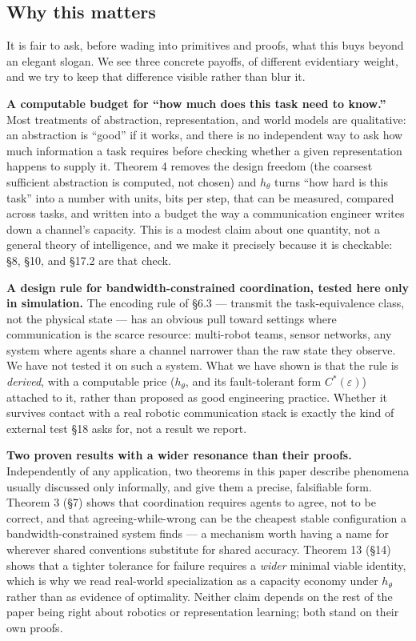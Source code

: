 \documentclass[11pt]{article}
\begin{document}
\hypertarget{why-this-matters}{%
\subsection{Why this matters}\label{why-this-matters}}

It is fair to ask, before wading into primitives and proofs, what this buys beyond an elegant slogan. We see three concrete payoffs, of different evidentiary weight, and we try to keep that difference visible rather than blur it.

\textbf{A computable budget for ``how much does this task need to know.''} Most treatments of abstraction, representation, and world models are qualitative: an abstraction is ``good'' if it works, and there is no independent way to ask how much information a task requires before checking whether a given representation happens to supply it. Theorem 4 removes the design freedom (the coarsest sufficient abstraction is computed, not chosen) and \(h_\theta\) turns ``how hard is this task'' into a number with units, bits per step, that can be measured, compared across tasks, and written into a budget the way a communication engineer writes down a channel's capacity. This is a modest claim about one quantity, not a general theory of intelligence, and we make it precisely because it is checkable: \S{}8, \S{}10, and \S{}17.2 are that check.

\textbf{A design rule for bandwidth-constrained coordination, tested here only in simulation.} The encoding rule of \S{}6.3 --- transmit the task-equivalence class, not the physical state --- has an obvious pull toward settings where communication is the scarce resource: multi-robot teams, sensor networks, any system where agents share a channel narrower than the raw state they observe. We have not tested it on such a system. What we have shown is that the rule is \emph{derived}, with a computable price (\(h_\theta\), and its fault-tolerant form \(C^*(\varepsilon)\)) attached to it, rather than proposed as good engineering practice. Whether it survives contact with a real robotic communication stack is exactly the kind of external test \S{}18 asks for, not a result we report.

\textbf{Two proven results with a wider resonance than their proofs.} Independently of any application, two theorems in this paper describe phenomena usually discussed only informally, and give them a precise, falsifiable form. Theorem 3 (\S{}7) shows that coordination requires agents to agree, not to be correct, and that agreeing-while-wrong can be the cheapest stable configuration a bandwidth-constrained system finds --- a mechanism worth having a name for wherever shared conventions substitute for shared accuracy. Theorem 13 (\S{}14) shows that a tighter tolerance for failure requires a \emph{wider} minimal viable identity, which is why we read real-world specialization as a capacity economy under \(h_\theta\) rather than as evidence of optimality. Neither claim depends on the rest of the paper being right about robotics or representation learning; both stand on their own proofs.
\end{document}
